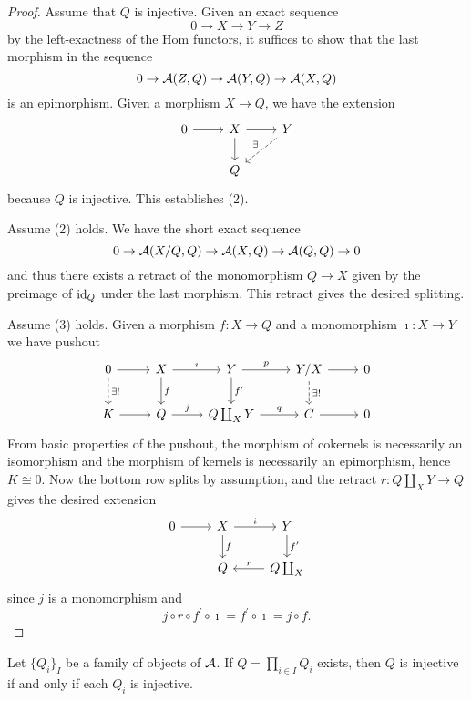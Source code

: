 \documentclass[dissertation.tex]{subfiles}
\begin{document}
\begin{proof}
  Assume that $Q$ is injective.
  Given an exact sequence
  $$0 \to X \to Y \to Z$$
  by the left-exactness of the Hom functors, it suffices to show that the last morphism in the sequence
  $$0 \to \mathcal{A}(Z,Q) \to \mathcal{A}(Y,Q) \to \mathcal{A}(X,Q)$$
  is an epimorphism.
  Given a morphism $X \to Q$, we have the extension
  $$\begin{tikzcd}
    0 \arrow{r} & X \arrow{r}\arrow{d} & Y \arrow[dashed,swap]{ld}{\exists}\\
    & Q
  \end{tikzcd}$$
  because $Q$ is injective.
  This establishes (2).

  Assume (2) holds.
  We have the short exact sequence
  $$0 \to \mathcal{A}(X/Q,Q) \to \mathcal{A}(X,Q) \to \mathcal{A}(Q,Q) \to 0$$
  and thus there exists a retract of the monomorphism $Q \to X$ given by the preimage of $\operatorname{id}_Q$ under the last morphism.
  This retract gives the desired splitting.

  Assume (3) holds.
  Given a morphism $f \colon X \to Q$ and a monomorphism $\imath \colon X \to Y$ we have pushout
  $$\begin{tikzcd}
    0 \arrow{r}\arrow[dashed]{d}{\exists !} & X \arrow{r}{\imath}\arrow{d}{f} & Y \arrow{r}{p}\arrow{d}{f^\prime} & Y/X \arrow{r}\arrow[dashed]{d}{\exists !} & 0\\
    K \arrow{r} & Q \arrow{r}{j} & Q \coprod_X Y \arrow{r}{q} & C \arrow{r} & 0
  \end{tikzcd}$$
  From basic properties of the pushout, the morphism of cokernels is necessarily an isomorphism and the morphism of kernels is necessarily an epimorphism, hence $K \cong 0$.
  Now the bottom row splits by assumption, and the retract $r \colon Q \coprod_X Y \to Q$ gives the desired extension
  $$\begin{tikzcd}
    0 \arrow{r} & X \arrow{r}{i}\arrow{d}{f} & Y \arrow{d}{f^\prime}\\
    & Q & Q \coprod_X \arrow[swap]{l}{r}
  \end{tikzcd}$$
  since $j$ is a monomorphism and
  $$j \circ r \circ f^\prime \circ \imath = f^\prime \circ \imath = j \circ f.$$
\end{proof}

\begin{proposition}
  Let $\{Q_i\}_I$ be a family of objects of $\mathcal{A}$.
  If $Q = \prod_{i \in I} Q_i$ exists, then $Q$ is injective if and only if each $Q_i$ is injective.
\end{proposition}
\end{document}
